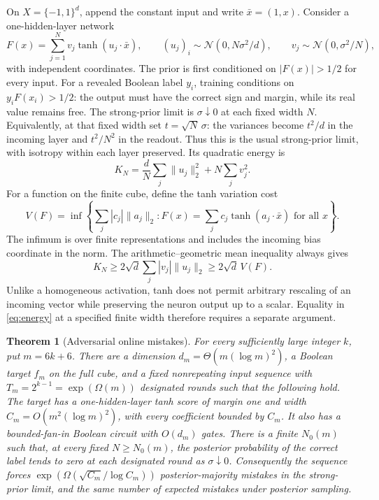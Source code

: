 \documentclass[11pt]{article}
\newtheorem{theorem}{Theorem}
\theoremstyle{remark}\newtheorem{remark}[theorem]{Remark}
\begin{document}
On $X=\{-1,1\}^d$, append the constant input and write $\bar x=(1,x)$.
Consider a one-hidden-layer network
\[
 F(x)=\sum_{j=1}^N v_j\tanh(u_j\cdot\bar x),\qquad
 (u_j)_i\sim\mathcal N(0,N\sigma^2/d),\qquad
 v_j\sim\mathcal N(0,\sigma^2/N),
\]
with independent coordinates. The prior is first conditioned on
$|F(x)|>1/2$ for every input. For a revealed Boolean label $y_i$,
training conditions on $y_iF(x_i)>1/2$: the output must have the
correct sign and margin, while its real value remains free. The strong-prior limit is $\sigma\downarrow0$ at each
fixed width $N$. Equivalently, at that fixed width set
$t=\sqrt N\,\sigma$: the variances become $t^2/d$ in the incoming
layer and $t^2/N^2$ in the readout. Thus this is the usual strong-prior
limit, with isotropy within each layer preserved. Its quadratic energy is
\[
 K_N=\frac dN\sum_j\|u_j\|_2^2+N\sum_jv_j^2.
\]
For a function on the finite cube, define the tanh variation cost
\begin{equation}\label{eq:variation}
 V(F)=\inf\left\{\sum_j|c_j|\|a_j\|_2:
 F(x)=\sum_jc_j\tanh(a_j\cdot\bar x)\text{ for all }x\right\}.
\end{equation}
The infimum is over finite representations and includes the incoming
bias coordinate in the norm. The arithmetic--geometric mean inequality
always gives
\begin{equation}\label{eq:energy}
 K_N\ge2\sqrt d\sum_j|v_j|\|u_j\|_2\ge2\sqrt d\,V(F).
\end{equation}
Unlike a homogeneous activation, tanh does not permit arbitrary
rescaling of an incoming vector while preserving the neuron output up
to a scalar. Equality in \eqref{eq:energy} at a specified finite width
therefore requires a separate argument.

\begin{theorem}[Adversarial online mistakes]\label{thm:main-online}
For every sufficiently large integer $k$, put
$m=6k+6$. There are a dimension $d_m=\Theta(m(\log m)^2)$,
a Boolean target $f_m$ on the full cube, and a fixed nonrepeating
input sequence with $T_m=2^{k-1}=\exp(\Omega(m))$ designated rounds
such that the following hold.
The target has a one-hidden-layer tanh score of margin one and width
$C_m=O(m^2(\log m)^2)$, with every coefficient bounded by $C_m$. It also
has a bounded-fan-in Boolean circuit with $O(d_m)$ gates.
There is a finite $N_0(m)$ such that, at every fixed $N\ge N_0(m)$,
the posterior probability of the correct label tends to zero at each
designated round as $\sigma\downarrow0$.
Consequently the sequence forces $\exp(\Omega(\sqrt{C_m}/\log C_m))$
posterior-majority mistakes in the strong-prior limit, and the same
number of expected mistakes under posterior sampling.
\end{theorem}
\end{document}
